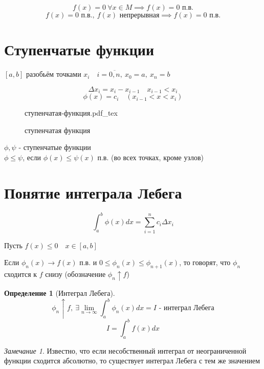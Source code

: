 \documentclass[a4paper]{article}
\newcommand{\incfig}[1]{%
\def\svgwidth{\columnwidth}
{#1.pdf_tex}
}
\theoremstyle{definition}
\newtheorem*{definition}{Определение}
\theoremstyle{remark}
\newtheorem*{remark}{Замечание}
\begin{document}
\[
    f(x) = 0 \ \forall x \in M \implies f(x) = 0 \text{ п.в.}
\]
\[
    f(x) = 0 \text{ п.в.}, \ f(x) \text{ непрерывная} \implies f(x) = 0 \text{ п.в.}
\]

\section*{\centering Ступенчатые функции}

$ [a,b] $ разобьём точками $ x_i \quad i = \overline{0,n}, \ x_0 = a, \ x_n = b $ 

\[
    \Delta x_i = x_i - x_{i-1} \quad x_{i-1} < x_i
\]
\[
    \phi(x) = c_i \quad (x_{i-1} < x < x_i)
\]

\begin{figure}[ht]
    \centering
    \incfig{ступенчатая-функция}
    \caption{ступенчатая функция}
    \label{fig:ступенчатая-функция}
\end{figure}

$ \phi, \psi $ - ступенчатые функции\\
$ \phi \leq \psi $, если $ \phi(x) \leq \psi(x) $ п.в. (во всех точках, кроме
узлов)

\section*{\centering Понятие интеграла Лебега}
\[
    \int_{a}^{b} \phi(x) dx = \sum_{i=1}^{n} c_i \Delta x_i
\]

Пусть $ f(x) \leq 0 \quad x \in [a,b] $ 

Если $ \phi_n(x) \rightarrow f(x) $ п.в. и $ 0 \leq \phi_n(x) \leq \phi_{n+1}(x) $,
то говорят, что $ \phi_n $ сходится к $ f $ снизу (обозначение $ \phi_n \uparrow f $) 

\begin{tcolorbox}[title=Интеграл Лебега]
    \begin{definition}[Интеграл Лебега]
        \[
            \phi_n \uparrow f, \ \exists \lim_{n \to \infty} \int_{a}^{b} 
            \phi_n(x) dx = I \text{ - интеграл Лебега}
        \]
        \[
            I = \int_{a}^{b} f(x) dx
        \]
    \end{definition}
\end{tcolorbox}

\begin{tcolorbox}
\begin{remark}
    Известно, что если несобственный интеграл от неограниченной функции сходится
    абсолютно, то существует интеграл Лебега с тем же значением
\end{remark}
\end{tcolorbox}
\end{document}
